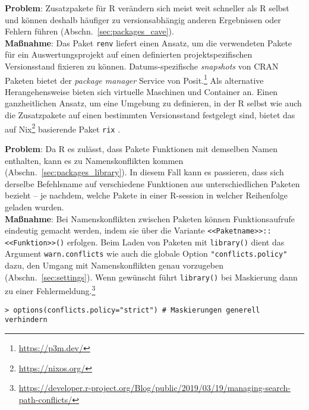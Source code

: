 \textbf{Problem}: Zusatzpakete für R verändern sich meist weit schneller als R selbst und können deshalb häufiger zu versionsabhängig anderen Ergebnissen oder Fehlern führen (Abschn.\ \ref{sec:packages_cave}).\\
\textbf{Maßnahme}: Das Paket \lstinline!renv! \cite{Ushey2019} liefert einen Ansatz, um die verwendeten Pakete für ein Auswertungsprojekt auf einen definierten projektspezifischen Versionsstand fixieren zu können. Datums-spezifische \emph{snapshots} von CRAN Paketen bietet der \emph{package manager} Service von Posit.\footnote{\url{https://p3m.dev/}} Als alternative Herangehensweise bieten sich virtuelle Maschinen und Container an. Einen ganzheitlichen Ansatz, um eine Umgebung zu definieren, in der R selbst wie auch die Zusatzpakete auf einen bestimmten Versionsstand festgelegt sind, bietet das auf Nix\footnote{\url{https://nixos.org/}} basierende Paket \lstinline!rix! \cite{Rodrigues2024}.

\textbf{Problem}: Da R es zulässt, dass Pakete Funktionen mit demselben Namen enthalten, kann es zu Namenskonflikten kommen (Abschn.\ \ref{sec:packages_library}). In diesem Fall kann es passieren, dass sich derselbe Befehlsname auf verschiedene Funktionen aus unterschiedlichen Paketen bezieht -- je nachdem, welche Pakete in einer R-session in welcher Reihenfolge geladen wurden.\\
\textbf{Maßnahme}: Bei Namenskonflikten zwischen Paketen können Funktionsaufrufe eindeutig gemacht werden, indem sie über die Variante \lstinline!<<Paketname>>::<<Funktion>>()! erfolgen. Beim Laden von Paketen mit \lstinline!library()! dient das Argument \lstinline!warn.conflicts! wie auch die globale Option \lstinline!"conflicts.policy"! dazu, den Umgang mit Namenskonflikten genau vorzugeben (Abschn.\ \ref{sec:settings}). Wenn gewünscht führt \lstinline!library()! bei Maskierung dann zu einer Fehlermeldung.\footnote{\url{https://developer.r-project.org/Blog/public/2019/03/19/managing-search-path-conflicts/}}
\begin{lstlisting}
> options(conflicts.policy="strict") # Maskierungen generell verhindern
\end{lstlisting}

